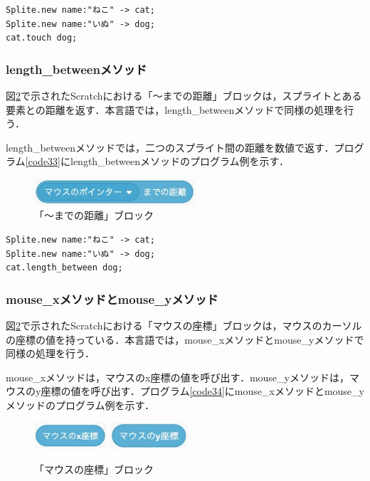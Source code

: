 \documentclass[10pt,a4j]{ltjsarticle}
\begin{document}
\begin{lstlisting}[caption=touchメソッドのプログラム例, label=code32]
Splite.new name:"ねこ" -> cat;
Splite.new name:"いぬ" -> dog;
cat.touch dog;
\end{lstlisting}

\subsubsection{length\_betweenメソッド}
図\ref{fig:length}で示されたScratchにおける「〜までの距離」ブロックは，スプライトとある要素との距離を返す．本言語では，length\_betweenメソッドで同様の処理を行う．

length\_betweenメソッドでは，二つのスプライト間の距離を数値で返す．プログラム\ref{code33}にlength\_betweenメソッドのプログラム例を示す．

\begin{figure}[H]
  \centering
  \includegraphics[height=10mm]{images/mouse.pdf}
  \caption{「〜までの距離」ブロック}
  \label{fig:length}
\end{figure}

\begin{lstlisting}[caption=length\_betweenメソッドのプログラム例, label=code33]
Splite.new name:"ねこ" -> cat;
Splite.new name:"いぬ" -> dog;
cat.length_between dog;
\end{lstlisting}

\subsubsection{mouse\_xメソッドとmouse\_yメソッド}
図\ref{fig:length}で示されたScratchにおける「マウスの座標」ブロックは，マウスのカーソルの座標の値を持っている．本言語では，mouse\_xメソッドとmouse\_yメソッドで同様の処理を行う．

mouse\_xメソッドは，マウスのx座標の値を呼び出す．mouse\_yメソッドは，マウスのy座標の値を呼び出す．プログラム\ref{code34}にmouse\_xメソッドとmouse\_yメソッドのプログラム例を示す．

\begin{figure}[H]
  \centering
  \includegraphics[height=10mm]{images/mouse_x.pdf} 
  \includegraphics[height=10mm]{images/mouse_y.pdf} 
  \caption{「マウスの座標」ブロック}
  \label{fig:length}
\end{figure}
\end{document}
